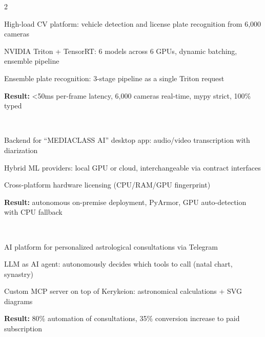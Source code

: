 \documentclass[]{deedy-resume-reversed}
\begin{document}
\begin{paracol}{2}
\\
\begin{tightemize}
\item High-load CV platform: vehicle detection and license plate recognition from 6,000 cameras
\item NVIDIA Triton + TensorRT: 6 models across 6 GPUs, dynamic batching, ensemble pipeline
\item Ensemble plate recognition: 3-stage pipeline as a single Triton request
\item \textbf{Result:} <50ms per-frame latency, 6,000 cameras real-time, mypy strict, 100\% typed
\end{tightemize}
\sectionsep

\\
\begin{tightemize}
\item Backend for ``MEDIACLASS AI'' desktop app: audio/video transcription with diarization
\item Hybrid ML providers: local GPU or cloud, interchangeable via contract interfaces
\item Cross-platform hardware licensing (CPU/RAM/GPU fingerprint)
\item \textbf{Result:} autonomous on-premise deployment, PyArmor, GPU auto-detection with CPU fallback
\end{tightemize}
\sectionsep

\\
\begin{tightemize}
\item AI platform for personalized astrological consultations via Telegram
\item LLM as AI agent: autonomously decides which tools to call (natal chart, synastry)
\item Custom MCP server on top of Kerykeion: astronomical calculations + SVG diagrams
\item \textbf{Result:} 80\% automation of consultations, 35\% conversion increase to paid subscription
\end{tightemize}
\sectionsep


\end{paracol}
\end{document}
